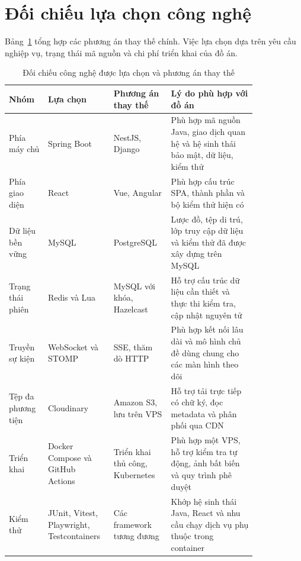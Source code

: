 \documentclass[../DoAn.tex]{subfiles}
\begin{document}
\section{Đối chiếu lựa chọn công nghệ}

Bảng~\ref{tab:chapter3-technology-comparison} tổng hợp các phương án thay thế chính. Việc lựa chọn dựa trên yêu cầu nghiệp vụ, trạng thái mã nguồn và chi phí triển khai của đồ án.

\begin{table}[H]
    \centering
    \caption{Đối chiếu công nghệ được lựa chọn và phương án thay thế}
    \label{tab:chapter3-technology-comparison}
    \footnotesize
    \renewcommand{\arraystretch}{1.15}
    \begin{tabular}{|>{\raggedright\arraybackslash}p{0.14\linewidth}|>{\raggedright\arraybackslash}p{0.18\linewidth}|>{\raggedright\arraybackslash}p{0.20\linewidth}|>{\raggedright\arraybackslash}p{0.31\linewidth}|}
        \hline
        \textbf{Nhóm} & \textbf{Lựa chọn} & \textbf{Phương án thay thế} & \textbf{Lý do phù hợp với đồ án} \\ \hline
        Phía máy chủ & Spring Boot & NestJS, Django & Phù hợp mã nguồn Java, giao dịch quan hệ và hệ sinh thái bảo mật, dữ liệu, kiểm thử \\ \hline
        Phía giao diện & React & Vue, Angular & Phù hợp cấu trúc SPA, thành phần và bộ kiểm thử hiện có \\ \hline
        Dữ liệu bền vững & MySQL & PostgreSQL & Lược đồ, tệp di trú, lớp truy cập dữ liệu và kiểm thử đã được xây dựng trên MySQL \\ \hline
        Trạng thái phiên & Redis và Lua & MySQL với khóa, Hazelcast & Hỗ trợ cấu trúc dữ liệu cần thiết và thực thi kiểm tra, cập nhật nguyên tử \\ \hline
        Truyền sự kiện & WebSocket và STOMP & SSE, thăm dò HTTP & Phù hợp kết nối lâu dài và mô hình chủ đề dùng chung cho các màn hình theo dõi \\ \hline
        Tệp đa phương tiện & Cloudinary & Amazon S3, lưu trên VPS & Hỗ trợ tải trực tiếp có chữ ký, đọc metadata và phân phối qua CDN \\ \hline
        Triển khai & Docker Compose và GitHub Actions & Triển khai thủ công, Kubernetes & Phù hợp một VPS, hỗ trợ kiểm tra tự động, ảnh bất biến và quy trình phê duyệt \\ \hline
        Kiểm thử & JUnit, Vitest, Playwright, Testcontainers & Các framework tương đương & Khớp hệ sinh thái Java, React và nhu cầu chạy dịch vụ phụ thuộc trong container \\ \hline
    \end{tabular}
\end{table}
\end{document}

